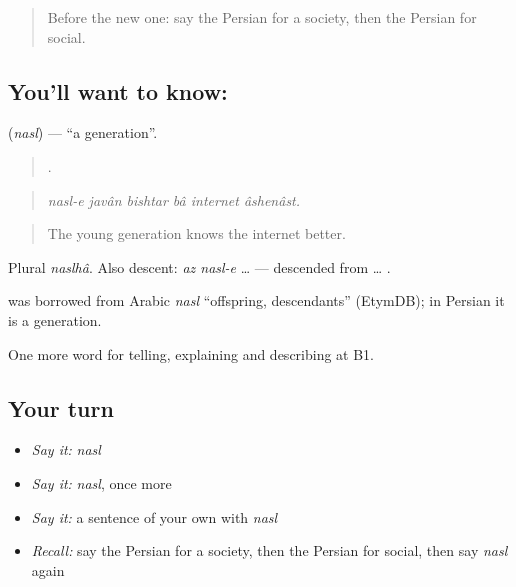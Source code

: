 \label{lesson:FA-C385-nasl}



\begin{quote}
Before the new one: say the Persian for a society, then the Persian for social.
\end{quote}

\subsection*{You'll want to know: }
\textbf{} (\emph{nasl}) — \textquotedblleft{}a generation\textquotedblright{}.

\begin{quote}
     .
\end{quote}

\begin{quote}
\emph{nasl-e javân bishtar bâ internet âshenâst.}
\end{quote}

\begin{quote}
The young generation knows the internet better.
\end{quote}

Plural \emph{naslhâ}. Also descent: \emph{az nasl-e} … — descended from … .

\begin{cousinweb}
\textbf{} was borrowed from Arabic \emph{nasl} \textquotedblleft{}offspring, descendants\textquotedblright{} (EtymDB); in Persian it is a generation.
\end{cousinweb}

\begin{grammarlens}[title={What you've built}]
One more word for telling, explaining and describing at B1.
\end{grammarlens}

\subsection*{Your turn}
\begin{itemize}
\raggedright
  \item \emph{Say it:} \emph{nasl}
  \item \emph{Say it:} \emph{nasl}, once more
  \item \emph{Say it:} a sentence of your own with \emph{nasl}
  \item \emph{Recall:} say the Persian for a society, then the Persian for social, then say \emph{nasl} again
\end{itemize}

